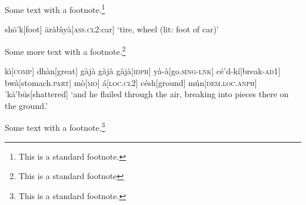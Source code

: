 \documentclass[12pt]{article}
\begin{document}
Some text with a footnote.\footnote{This is a standard footnote.}

\ex[glstyle=nlevel]
\begingl
sh\=o'k[foot]
{\=ar\`ab{\v\i}y\`a}[\textsc{ass.cl2}:car]
\glft `tire, wheel (lit: foot of car)'
\endgl
{}
\xe

Some more text with a footnote.\footnote{This is a standard footnote}

\ex[glstyle=nlevel]
\begingl
{k\'\i}[\textsc{comp}]
dh\`an[great]
{g\`aj\`a g\`aj\`a g\`aj\`a}[\textsc{idph}]
y\`a-\`a[go.\textsc{sing-lnk}]
c\'e'd-k{\'i}[break-\textsc{ad1}]
bw\`a[stomach.\textsc{part}]
m\`o[\textsc{mo}]
\'a[\textsc{loc.cl2}]
c\'esh[ground]
m\'un[\textsc{dem.loc.anph}]
'k\=a'b\=us[shattered]
\glft `and he flailed through the air, breaking into pieces there on the
ground.'
\endgl
{}
\xe

Some text with a footnote.\footnote{This is a standard footnote.}
\end{document}
